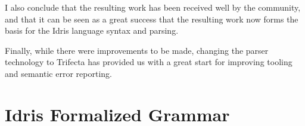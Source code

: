 \documentclass[a4paper]{article}%
\begin{document}
I also conclude that the resulting work has been received well by the community, and that it can be seen as a great success that the resulting work now forms the basis for
the Idris language syntax and parsing.

Finally, while there were improvements to be made, changing the parser technology to Trifecta has provided us with a great start for improving tooling and semantic error reporting.





\pagebreak
\appendix
\section{Idris Formalized Grammar}
\label{sec:IdrisFormalizedGrammar}
  
\end{document}

